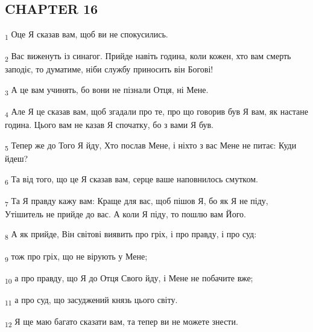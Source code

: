 \subsection{CHAPTER 16}
\begin{tcolorbox}
\textsubscript{1} Оце Я сказав вам, щоб ви не спокусились.
\end{tcolorbox}
\begin{tcolorbox}
\textsubscript{2} Вас виженуть із синагог. Прийде навіть година, коли кожен, хто вам смерть заподіє, то думатиме, ніби службу приносить він Богові!
\end{tcolorbox}
\begin{tcolorbox}
\textsubscript{3} А це вам учинять, бо вони не пізнали Отця, ні Мене.
\end{tcolorbox}
\begin{tcolorbox}
\textsubscript{4} Але Я це сказав вам, щоб згадали про те, про що говорив був Я вам, як настане година. Цього вам не казав Я спочатку, бо з вами Я був.
\end{tcolorbox}
\begin{tcolorbox}
\textsubscript{5} Тепер же до Того Я йду, Хто послав Мене, і ніхто з вас Мене не питає: Куди йдеш?
\end{tcolorbox}
\begin{tcolorbox}
\textsubscript{6} Та від того, що це Я сказав вам, серце ваше наповнилось смутком.
\end{tcolorbox}
\begin{tcolorbox}
\textsubscript{7} Та Я правду кажу вам: Краще для вас, щоб пішов Я, бо як Я не піду, Утішитель не прийде до вас. А коли Я піду, то пошлю вам Його.
\end{tcolorbox}
\begin{tcolorbox}
\textsubscript{8} А як прийде, Він світові виявить про гріх, і про правду, і про суд:
\end{tcolorbox}
\begin{tcolorbox}
\textsubscript{9} тож про гріх, що не вірують у Мене;
\end{tcolorbox}
\begin{tcolorbox}
\textsubscript{10} а про правду, що Я до Отця Свого йду, і Мене не побачите вже;
\end{tcolorbox}
\begin{tcolorbox}
\textsubscript{11} а про суд, що засуджений князь цього світу.
\end{tcolorbox}
\begin{tcolorbox}
\textsubscript{12} Я ще маю багато сказати вам, та тепер ви не можете знести.
\end{tcolorbox}
